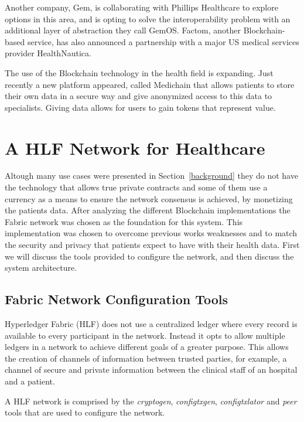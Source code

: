 \documentclass[]{llncs}
\begin{document}
Another company, Gem, is collaborating with Phillips Healthcare to explore
options in this area, and is opting to solve the interoperability problem with
an additional layer of abstraction they call GemOS.  Factom, another
Blockchain-based service, has also announced a partnership with a major US
medical services provider
HealthNautica.\cite{BlockchainCompHealth2017,FactomPartnership2017}

The use of the Blockchain technology in the health field is expanding. Just
recently a new platform appeared, called Medichain that allows patients to
store their own data in a secure way and give anonymized access to this data to
specialists. Giving data allows for users to gain tokens that represent value.
\cite{MediChain2018}


\section{A HLF Network for Healthcare} \label{HLFHealthcare} Altough many use
cases were presented in Section~\ref{background} they do not have the
technology that allows true private contracts and some of them use a currency
as a means to ensure the network consensus is achieved, by monetizing the
patients data.  After analyzing the different Blockchain implementations the
Fabric network was chosen as the foundation for this system. This
implementation was chosen to overcome previous works weaknesses and to match
the security and privacy that patients expect to have with their health data.
First we will discuss the tools provided to configure the network, and then
discuss the system architecture.

\subsection{Fabric Network Configuration Tools}

Hyperledger Fabric (HLF) does not use a centralized ledger where every record
is available to every participant in the network.  Instead it opts to allow
multiple ledgers in a network to achieve different goals of a greater purpose.
This allows the creation of channels of information between trusted parties,
for example, a channel of secure and private information between the clinical
staff of an hospital and a patient.

A HLF network is comprised by the \textit{cryptogen}, \textit{configtxgen},
\textit{configtxlator} and \textit{peer} tools that are used to configure the
network.
\end{document}
